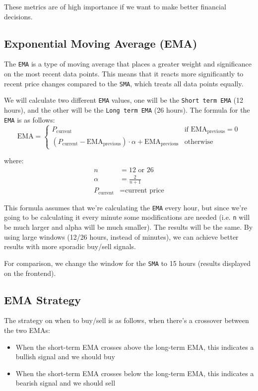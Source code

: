 \documentclass{article}
\begin{document}
These metrics are of high importance if we want to make better financial decisions.

\subsection{Exponential Moving Average (EMA)}
The \texttt{EMA} is a type of moving average that places a greater weight and significance on the most recent data points.
This means that it reacts more significantly to recent price changes compared to the \texttt{SMA}, which 
treats all data points equally.

We will calculate two different \texttt{EMA} values, one will be the \texttt{Short term EMA} (12 hours),
and the other will be the \texttt{Long term EMA} (26 hours). The formula for the \texttt{EMA} is as follows:
\begin{equation*}
\text{EMA} = \begin{cases}
P_{\text{current}} & \text{if } \text{EMA}_{\text{previous}} = 0 \\
(P_{\text{current}} - \text{EMA}_{\text{previous}}) \cdot \alpha + \text{EMA}_{\text{previous}} & \text{otherwise}
\end{cases}
\end{equation*}

where:
\begin{align*}
n &= 12 \text{ or } 26 \\
\alpha &= \frac{2}{n + 1} \\
P_{\text{current}} &= \text{current price}
\end{align*}

This formula assumes that we're calculating the \texttt{EMA} every hour, but since we're going to be calculating it
every minute some modifications are needed (i.e. \texttt{n} will be much larger and alpha will be much smaller).
The results will be the same. By using large windows (12/26 hours, instead of minutes), we can achieve better results
with more sporadic buy/sell signals.

For comparison, we change the window for the \texttt{SMA} to 15 hours (results displayed on the frontend).

\subsection{EMA Strategy}
The strategy on when to buy/sell is as follows, when there's a crossover between the two EMAs:
\begin{itemize}
    \item When the short-term EMA crosses above the long-term EMA, this indicates a bullish signal and we should buy
    \item When the short-term EMA crosses below the long-term EMA, this indicates a bearish signal and we should sell
\end{itemize}
\end{document}
